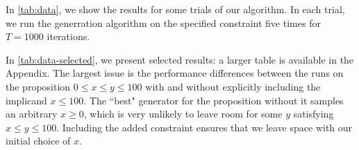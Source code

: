 \documentclass[sigconf,nonacm,review,anonymous]{acmart}
\begin{document}

In \autoref{tab:data}, we show the results for some trials of our algorithm. In
each trial, we run the generration algorithm on the specified constraint five
times for $T = 1000$ iterations. 

In \autoref{tab:data-selected}, we present selected results: a larger table
is available in the Appendix. The largest issue is the performance
differences between the runs on the proposition $0 \leq x \leq y \leq 100$ with
and without explicitly including the implicand $x \leq 100$.
The ``best" generator for the proposition without it samples an
arbitrary $x \geq 0$, which is very unlikely to leave room for some $y$
satisfying $x \leq y \leq 100$. Including the added constraint ensures that we leave space
with our initial choice of $x$.


\begin{table}[h]
\label{tab:data-selected}
\centering
{}
\end{table}
\end{document}
